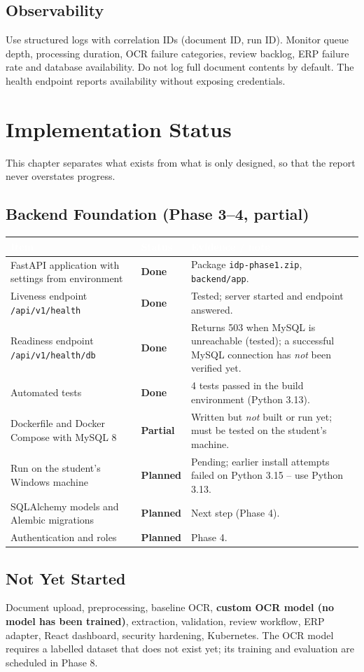 \documentclass[11pt,a4paper]{report}
\newcommand{\hdr}[1]{\textcolor{white}{\sffamily\bfseries #1}}
\newcommand{\tblstart}{\rowcolors{2}{white}{rowgray}\arrayrulecolor{teal!60}}
\newcommand{\hdrrow}{\rowcolor{navy}}
\newcommand{\done}{\textcolor{leaf}{\sffamily\bfseries Done}}
\newcommand{\inprog}{\textcolor{amber!85!black}{\sffamily\bfseries Partial}}
\newcommand{\todo}{\textcolor{slate}{\sffamily\bfseries Planned}}
\begin{document}
\section{Observability}
Use structured logs with correlation IDs (document ID, run ID). Monitor queue depth, processing duration, OCR failure categories, review backlog, ERP failure rate and database availability. Do not log full document contents by default. The health endpoint reports availability without exposing credentials.

\chapter{Implementation Status}\label{ch:status}
This chapter separates what exists from what is only designed, so that the report never overstates progress.

\section{Backend Foundation (Phase 3--4, partial)}
{\tblstart\small
\begin{longtable}{L{4.6cm}L{1.9cm}L{7.3cm}}
\hdrrow \hdr{Item} & \hdr{Status} & \hdr{Evidence / note}\\ \endhead
FastAPI application with settings from environment & \done & Package \texttt{idp-phase1.zip}, \texttt{backend/app}.\\
Liveness endpoint \texttt{/api/v1/health} & \done & Tested; server started and endpoint answered.\\
Readiness endpoint \texttt{/api/v1/health/db} & \done & Returns 503 when MySQL is unreachable (tested); a successful MySQL connection has \emph{not} been verified yet.\\
Automated tests & \done & 4 tests passed in the build environment (Python 3.13).\\
Dockerfile and Docker Compose with MySQL 8 & \inprog & Written but \emph{not} built or run yet; must be tested on the student's machine.\\
Run on the student's Windows machine & \todo & Pending; earlier install attempts failed on Python 3.15 -- use Python 3.13.\\
SQLAlchemy models and Alembic migrations & \todo & Next step (Phase 4).\\
Authentication and roles & \todo & Phase 4.\\
\hline
\end{longtable}}

\section{Not Yet Started}
Document upload, preprocessing, baseline OCR, \textbf{custom OCR model (no model has been trained)}, extraction, validation, review workflow, ERP adapter, React dashboard, security hardening, Kubernetes. The OCR model requires a labelled dataset that does not exist yet; its training and evaluation are scheduled in Phase 8.
\end{document}
